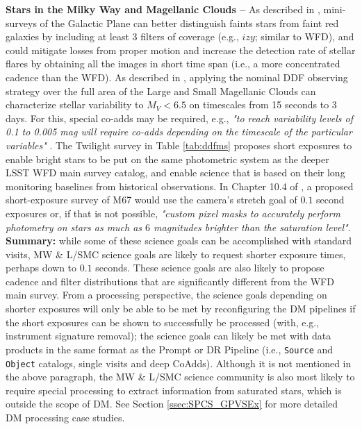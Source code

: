\documentclass[DM,lsstdoc,toc]{lsstdoc}
\begin{document}
\medskip
\noindent \textbf{Stars in the Milky Way and Magellanic Clouds -- } As described in , mini-surveys of the Galactic Plane can better distinguish faints stars from faint red galaxies by including at least 3 filters of coverage (e.g., $izy$; similar to WFD), and could mitigate losses from proper motion and increase the detection rate of stellar flares by obtaining all the images in short time span (i.e., a more concentrated cadence than the WFD).  As described in , applying the nominal DDF observing strategy over the full area of the Large and Small Magellanic Clouds can characterize stellar variability to $M_V<6.5$ on timescales from 15 seconds to 3 days. For this, special co-adds may be required, e.g., \textit{"to reach variability levels of 0.1 to 0.005 mag will require co-adds depending on the timescale of the particular variables"} . The Twilight survey in Table \ref{tab:ddfms} proposes short exposures to enable bright stars to be put on the same photometric system as the deeper LSST WFD main survey catalog, and enable science that is based on their long monitoring baselines from historical observations. In Chapter 10.4 of \citep{2017arXiv170804058L}, a proposed short-exposure survey of M67 would use the camera's stretch goal of $0.1$ second exposures or, if that is not possible, \textit{"custom pixel masks to accurately perform photometry on stars as much as $6$ magnitudes brighter than the saturation level"}. {\bf Summary:} while some of these science goals can be accomplished with standard visits, MW \& L/SMC science goals are likely to request shorter exposure times, perhaps down to $0.1$ seconds. These science goals are also likely to propose cadence and filter distributions that are significantly different from the WFD main survey. From a processing perspective, the science goals depending on shorter exposures will only be able to be met by reconfiguring the DM pipelines if the short exposures can be shown to successfully be processed (with, e.g., instrument signature removal); the science goals can likely be met with data products in the same format as the Prompt or DR Pipeline (i.e., {\tt Source} and {\tt Object} catalogs, single visits and deep CoAdds). Although it is not mentioned in the above paragraph, the MW \& L/SMC science community is also most likely to require special processing to extract information from saturated stars, which is outside the scope of DM. See Section \ref{ssec:SPCS_GPVSEx} for more detailed DM processing case studies.
\end{document}
